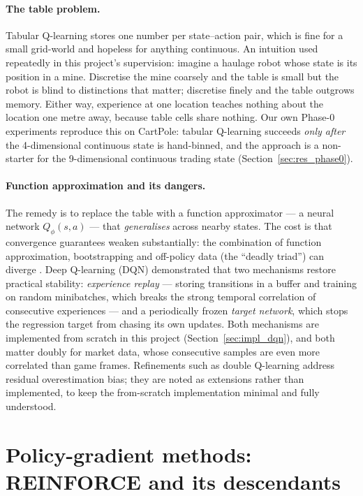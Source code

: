 \paragraph{The table problem.} Tabular Q-learning stores one number per
state--action pair, which is fine for a small grid-world and hopeless for
anything continuous. An intuition used repeatedly in this project's
supervision: imagine a haulage robot whose state is its position in a
mine. Discretise the mine coarsely and the table is small but the robot
is blind to distinctions that matter; discretise finely and the table
outgrows memory. Either way, experience at one location teaches
nothing about the location one metre away, because table cells share
nothing. Our own Phase-0 experiments reproduce this on CartPole: tabular
Q-learning succeeds \emph{only after} the 4-dimensional continuous state
is hand-binned, and the approach is a non-starter for the 9-dimensional
continuous trading state (Section~\ref{sec:res_phase0}).

\paragraph{Function approximation and its dangers.} The remedy is to
replace the table with a function approximator --- a neural network
$Q_\phi(s,a)$ --- that \emph{generalises} across nearby states. The cost
is that convergence guarantees weaken substantially: the combination of
function approximation, bootstrapping and off-policy data (the ``deadly
triad'') can diverge \cite{tsitsiklis1997, sutton2018}. Deep Q-learning
(DQN) \cite{mnih2015} demonstrated that two mechanisms restore practical
stability: \emph{experience replay} \cite{lin1992} --- storing
transitions in a buffer and training on random minibatches, which breaks
the strong temporal correlation of consecutive experiences --- and a
periodically frozen \emph{target network}, which stops the regression
target from chasing its own updates. Both mechanisms are implemented from
scratch in this project (Section~\ref{sec:impl_dqn}), and both matter
doubly for market data, whose consecutive samples are even more
correlated than game frames. Refinements such as double Q-learning
\cite{vanhasselt2016} address residual overestimation bias; they are
noted as extensions rather than implemented, to keep the from-scratch
implementation minimal and fully understood.

\section{Policy-gradient methods: REINFORCE and its descendants}
\label{sec:bg_pg}

